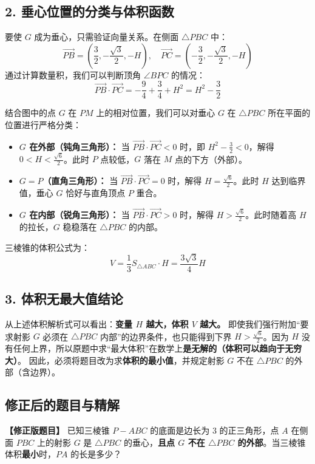 \documentclass[11pt,a4paper]{ctexart}
\begin{document}
\subsection*{2. 垂心位置的分类与体积函数}
要使 $G$ 成为垂心，只需验证向量关系。在侧面 $\triangle PBC$ 中：
$$\vec{PB} = \left(\frac{3}{2}, -\frac{\sqrt{3}}{2}, -H\right), \quad \vec{PC} = \left(-\frac{3}{2}, -\frac{\sqrt{3}}{2}, -H\right)$$
通过计算数量积，我们可以判断顶角 $\angle BPC$ 的情况：
$$\vec{PB} \cdot \vec{PC} = -\frac{9}{4} + \frac{3}{4} + H^2 = H^2 - \frac{3}{2}$$

结合图中的点 $G$ 在 $PM$ 上的相对位置，我们可以对垂心 $G$ 在 $\triangle PBC$ 所在平面的位置进行严格分类：
\begin{itemize}
    \item \textbf{$G$ 在外部（钝角三角形）：} 当 $\vec{PB} \cdot \vec{PC} < 0$ 时，即 $H^2 - \frac{3}{2} < 0$，解得 $0 < H < \frac{\sqrt{6}}{2}$。此时 $P$ 点较低，$G$ 落在 $M$ 点的下方（外部）。
    \item \textbf{$G = P$（直角三角形）：} 当 $\vec{PB} \cdot \vec{PC} = 0$ 时，解得 $H = \frac{\sqrt{6}}{2}$。此时 $H$ 达到临界值，垂心 $G$ 恰好与直角顶点 $P$ 重合。
    \item \textbf{$G$ 在内部（锐角三角形）：} 当 $\vec{PB} \cdot \vec{PC} > 0$ 时，解得 $H > \frac{\sqrt{6}}{2}$。此时随着高 $H$ 的拉长，$G$ 稳稳落在 $\triangle PBC$ 的内部。
\end{itemize}
三棱锥的体积公式为：
$$V = \frac{1}{3} S_{\triangle ABC} \cdot H = \frac{3\sqrt{3}}{4} H$$

\subsection*{3. 体积无最大值结论}
从上述体积解析式可以看出：\textbf{变量 $H$ 越大，体积 $V$ 越大。}
即使我们强行附加“要求射影 $G$ 必须在 $\triangle PBC$ 内部”的边界条件，也只能得到下界 $H > \frac{\sqrt{6}}{2}$。因为 $H$ 没有任何上界，所以原题中求“最大体积”在数学上\textbf{是无解的（体积可以趋向于无穷大）}。
因此，必须将题目改为求\textbf{体积的最小值}，并规定射影 $G$ 不在 $\triangle PBC$ 的外部（含边界）。

\newpage
\subsection{修正后的题目与精解}

\noindent \textbf{【修正版题目】} 已知三棱锥 $P-ABC$ 的底面是边长为 3 的正三角形，点 $A$ 在侧面 $PBC$ 上的射影 $G$ 是 $\triangle PBC$ 的垂心，\textbf{且点 $G$ 不在 $\triangle PBC$ 的外部}。当三棱锥体积\textbf{最小}时，$PA$ 的长是多少？
\end{document}
